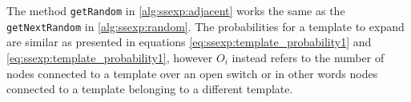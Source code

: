The method \texttt{getRandom} in \autoref{alg:ssexp:adjacent} works the same
as the \texttt{getNextRandom} in \autoref{alg:ssexp:random}. The probabilities
for a template to expand are similar as presented in equations \ref{eq:ssexp:template_probability1}
and \ref{eq:ssexp:template_probability1}, however $O_i$ instead refers to the number
of nodes connected to a template over an open switch or in other words nodes connected to a 
template belonging to a different template.

